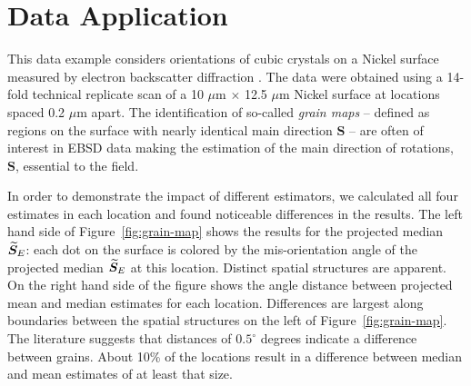 \section{Data Application}\label{sec:data}

This data example considers orientations of cubic crystals on a Nickel surface measured by electron backscatter diffraction \citep{bingham10b}. The data were obtained using a 14-fold technical replicate scan of a 10 $\mu$m $\times$ 12.5 $\mu$m Nickel surface at locations spaced 0.2 $\mu$m apart.
The identification of so-called {\it grain maps} -- defined as regions on the surface with nearly identical main direction $\bm S$ -- are often of interest in EBSD data making the estimation of the main direction of rotations, $\bm S$, essential to the field. 

In order to demonstrate the impact of different estimators, we calculated all four estimates in each location and found noticeable differences in the results. 
The left hand side of Figure~\ref{fig:grain-map} shows the results for the projected median   ${\widetilde{\bm S}_E}$: each dot on the surface is colored by  the mis-orientation angle of the  projected median ${\widetilde{\bm S}_E}$ at this  location.  Distinct spatial structures   are apparent. On the right hand side of the figure shows the angle distance between projected mean and median estimates for each location. Differences are largest along  boundaries between the spatial structures on the left of Figure~\ref{fig:grain-map}. The literature \citep{bingham10b} suggests that distances of $0.5^\circ$ degrees indicate a difference between grains. About 10\% of the locations result in a difference between median and mean estimates of at least that size. 

